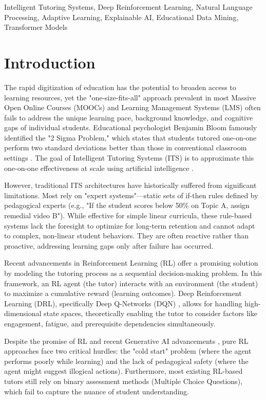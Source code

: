\documentclass[conference]{IEEEtran}
\begin{document}
\begin{IEEEkeywords}
Intelligent Tutoring Systems, Deep Reinforcement Learning, Natural Language Processing, Adaptive Learning, Explainable AI, Educational Data Mining, Transformer Models
\end{IEEEkeywords}

\section{Introduction}
The rapid digitization of education has the potential to broaden access to learning resources, yet the "one-size-fits-all" approach prevalent in most Massive Open Online Courses (MOOCs) and Learning Management Systems (LMS) often fails to address the unique learning pace, background knowledge, and cognitive gaps of individual students. Educational psychologist Benjamin Bloom famously identified the "2 Sigma Problem," which states that students tutored one-on-one perform two standard deviations better than those in conventional classroom settings \cite{bloom1984}. The goal of Intelligent Tutoring Systems (ITS) is to approximate this one-on-one effectiveness at scale using artificial intelligence \cite{vanlehn2011}.

However, traditional ITS architectures have historically suffered from significant limitations. Most rely on "expert systems"—static sets of if-then rules defined by pedagogical experts (e.g., "If the student scores below 50\% on Topic A, assign remedial video B"). While effective for simple linear curricula, these rule-based systems lack the foresight to optimize for long-term retention and cannot adapt to complex, non-linear student behaviors. They are often reactive rather than proactive, addressing learning gaps only after failure has occurred.

Recent advancements in Reinforcement Learning (RL) offer a promising solution by modeling the tutoring process as a sequential decision-making problem. In this framework, an RL agent (the tutor) interacts with an environment (the student) to maximize a cumulative reward (learning outcomes). Deep Reinforcement Learning (DRL), specifically Deep Q-Networks (DQN) \cite{mnih2015}, allows for handling high-dimensional state spaces, theoretically enabling the tutor to consider factors like engagement, fatigue, and prerequisite dependencies simultaneously.

Despite the promise of RL and recent Generative AI advancements \cite{kasneci2023}, pure RL approaches face two critical hurdles: the "cold start" problem (where the agent performs poorly while learning) and the lack of pedagogical safety (where the agent might suggest illogical actions). Furthermore, most existing RL-based tutors still rely on binary assessment methods (Multiple Choice Questions), which fail to capture the nuance of student understanding.
\end{document}
